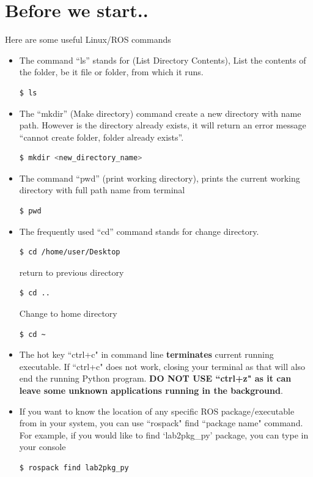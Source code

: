 \section{Before we start..}
Here are some useful Linux/ROS commands
\begin{itemize}
\item The command “ls” stands for (List Directory Contents), List the contents of the folder, be it file or folder, from which it runs.
\begin{lstlisting}[language=bash]
$ ls
\end{lstlisting}

\item The “mkdir” (Make directory) command create a new directory with name path. However is the directory already exists, it will return an
error message “cannot create folder, folder already exists”.
\begin{lstlisting}[language=bash]
$ mkdir <new_directory_name>
\end{lstlisting}

\item The command “pwd” (print working directory), prints the current working directory with full path name from terminal
\begin{lstlisting}[language=bash]
$ pwd
\end{lstlisting}

\item The frequently used “cd” command stands for change directory. 
\begin{lstlisting}[language=bash]
$ cd /home/user/Desktop
\end{lstlisting}
return to previous directory
\begin{lstlisting}[language=bash]
$ cd ..
\end{lstlisting}
Change to home directory
\begin{lstlisting}[language=bash]
$ cd ~
\end{lstlisting}

\item The hot key ``ctrl+c" in command line \textbf{terminates} current running executable.  If ``ctrl+c" does not work, closing your terminal as that will also end the running Python program. \textbf{DO NOT USE ``ctrl+z" as it can leave some unknown applications running in the background}.   

\item If you want to know the location of any specific ROS package/executable from in your system, you can use ``rospack" find  ``package name" command. For 
example, if you would like to find `lab2pkg\_py' package, you can type in your console
\begin{lstlisting}[language=bash]
$ rospack find lab2pkg_py
\end{lstlisting}


\end{itemize}
